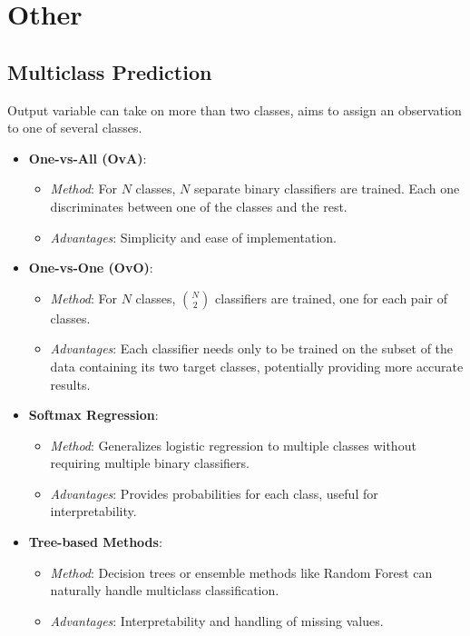 \documentclass[english, threecolumn]{latex4ei/latex4ei_sheet}
\begin{document}
\section{Other}
\begin{sectionbox}
\subsection{Multiclass Prediction}
Output variable can take on more than two classes, aims to assign an observation to one of several classes. 

\begin{itemize}
    \item \textbf{One-vs-All (OvA)}: 
    \begin{itemize}
        \item \textit{Method}: For \(N\) classes, \(N\) separate binary classifiers are trained. Each one discriminates between one of the classes and the rest.
        \item \textit{Advantages}: Simplicity and ease of implementation.
    \end{itemize}
    
    \item \textbf{One-vs-One (OvO)}:
    \begin{itemize}
        \item \textit{Method}: For \(N\) classes, \( \binom{N}{2} \) classifiers are trained, one for each pair of classes.
        \item \textit{Advantages}: Each classifier needs only to be trained on the subset of the data containing its two target classes, potentially providing more accurate results.
    \end{itemize}

    \item \textbf{Softmax Regression}:
    \begin{itemize}
        \item \textit{Method}: Generalizes logistic regression to multiple classes without requiring multiple binary classifiers.
        \item \textit{Advantages}: Provides probabilities for each class, useful for interpretability.
    \end{itemize}
    
    \item \textbf{Tree-based Methods}:
    \begin{itemize}
        \item \textit{Method}: Decision trees or ensemble methods like Random Forest can naturally handle multiclass classification.
        \item \textit{Advantages}: Interpretability and handling of missing values.
    \end{itemize}
\end{itemize}

\end{sectionbox}
\end{document}
